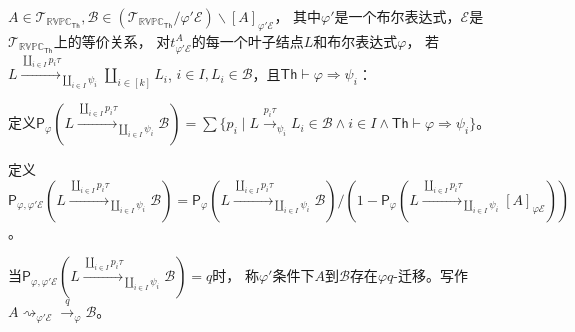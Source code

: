 \begin{definition}
   $A\in \mathcal{T}_{\mathbb{RVPC}_{\mathsf{Th}}},\mathcal{B}\in (\mathcal{T}_{\mathbb{RVPC}_{\mathsf{Th}}}/\varphi' \mathcal{E})\backslash [A]_{\varphi'\mathcal{E}}$，
   其中$\varphi'$是一个布尔表达式，$\mathcal{E}$是$\mathcal{T}_{\mathbb{RVPC}_{\mathsf{Th}}}$上的等价关系，
   对$t^A_{\varphi' \mathcal{E}}$的每一个叶子结点$L$和布尔表达式$\varphi$，
   若$L\stackrel{\coprod_{i\in I}p_i\tau}{\longrightarrow}_{\coprod_{i\in I}\psi_i} \coprod_{i\in [k]}L_i$,
$i\in I, L_i\in \mathcal{B}$，且$\mathsf{Th}\vdash \varphi \Rightarrow \psi_i$：

定义$\mathsf{P}_\varphi(L\stackrel{\coprod_{i\in I}p_i\tau}{\longrightarrow}_{\coprod_{i\in I}\psi_i}\mathcal{B}) = \sum\{p_i\mid L\stackrel{p_i\tau}{\rightarrow}_{\psi_i} L_i\in\mathcal{B} \wedge i\in I \wedge \mathsf{Th}\vdash \varphi \Rightarrow \psi_i\}$。

定义$\mathsf{P}_{\varphi, \varphi' \mathcal{E}}(L\stackrel{\coprod_{i\in I}p_i\tau}{\longrightarrow}_{\coprod_{i\in I}\psi_i}\mathcal{B}) = \mathsf{P}_\varphi(L\stackrel{\coprod_{i\in I}p_i\tau}{\longrightarrow}_{\coprod_{i\in I}\psi_i}\mathcal{B})/(1-\mathsf{P}_\varphi(L\stackrel{\coprod_{i\in I}p_i\tau}{\longrightarrow}_{\coprod_{i\in I}\psi_i}[A]_{\varphi\mathcal{E}}))$。

当$\mathsf{P}_{\varphi,\varphi' \mathcal{E}}(L\stackrel{\coprod_{i\in I}p_i\tau}{\longrightarrow}_{\coprod_{i\in I}\psi_i}\mathcal{B})=q$时，
称$\varphi'$条件下$A$到$\mathcal{B}$存在$\varphi q$-迁移。写作$A\rightsquigarrow_{\varphi'\mathcal{E}} \stackrel{q}{\rightarrow}_{\varphi} \mathcal{B}$。
\end{definition}

